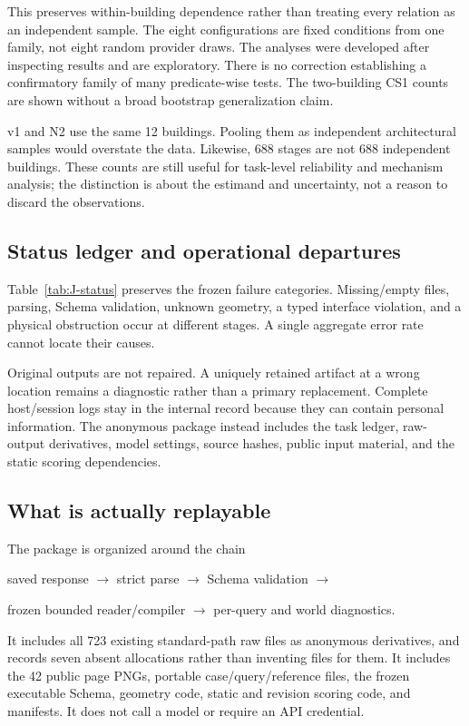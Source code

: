 This preserves within-building dependence rather than treating every relation as an independent sample. The eight configurations are fixed conditions from one family, not eight random provider draws. The analyses were developed after inspecting results and are exploratory. There is no correction establishing a confirmatory family of many predicate-wise tests. The two-building CS1 counts are shown without a broad bootstrap generalization claim.

v1 and N2 use the same 12 buildings. Pooling them as independent architectural samples would overstate the data. Likewise, 688 stages are not 688 independent buildings. These counts are still useful for task-level reliability and mechanism analysis; the distinction is about the estimand and uncertainty, not a reason to discard the observations.

\subsection{Status ledger and operational departures}
Table~\ref{tab:J-status} preserves the frozen failure categories. Missing/empty files, parsing, Schema validation, unknown geometry, a typed interface violation, and a physical obstruction occur at different stages. A single aggregate error rate cannot locate their causes.

\begin{table}[htbp]\centering\small

\caption{Frozen task statuses. P is raw/parse failure, S Schema failure, M missing output, and L the coarse limit label. The CS1 L case is a null world, not a measured size breach. Qwen M includes its three transport losses.}\label{tab:J-status}
\end{table}

Original outputs are not repaired. A uniquely retained artifact at a wrong location remains a diagnostic rather than a primary replacement. Complete host/session logs stay in the internal record because they can contain personal information. The anonymous package instead includes the task ledger, raw-output derivatives, model settings, source hashes, public input material, and the static scoring dependencies.

\subsection{What is actually replayable}
The package is organized around the chain
\begin{center}
saved response $\rightarrow$ strict parse $\rightarrow$ Schema validation $\rightarrow$\par
frozen bounded reader/compiler $\rightarrow$ per-query and world diagnostics.
\end{center}
It includes all 723 existing standard-path raw files as anonymous derivatives, and records seven absent allocations rather than inventing files for them. It includes the 42 public page PNGs, portable case/query/reference files, the frozen executable Schema, geometry code, static and revision scoring code, and manifests. It does not call a model or require an API credential.

